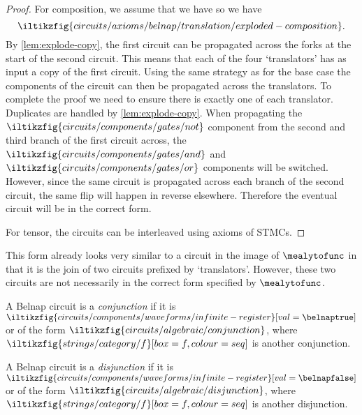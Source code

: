 \begin{proof}
    For composition, we assume that we have
    so we have \[
        \iltikzfig{circuits/axioms/belnap/translation/exploded-composition}.
    \]
    By \cref{lem:explode-copy}, the first circuit can be propagated across
    the forks at the start of the second circuit.
    This means that each of the four `translators' has as input a copy of the
    first circuit.
    Using the same strategy as for the base case the components of the circuit
    can then be propagated across the translators.
    To complete the proof we need to ensure there is exactly one of each
    translator.
    Duplicates are handled by \cref{lem:explode-copy}.
    When propagating the \(
    \iltikzfig{circuits/components/gates/not}
    \) component from the second and third branch of the first circuit across,
    the \(
    \iltikzfig{circuits/components/gates/and}
    \) and \(
    \iltikzfig{circuits/components/gates/or}
    \) components will be switched.
    However, since the same circuit is propagated across each branch of the
    second circuit, the same
    flip will happen in reverse elsewhere.
    Therefore the eventual circuit will be in the correct form.

    For tensor, the circuits can be interleaved using axioms of STMCs.
\end{proof}

This form already looks very similar to a circuit in the image of
\(\mealytofunc\) in that it is the join of two circuits prefixed by
`translators'.
However, these two circuits are not necessarily in the correct form specified by
\(\mealytofunc\).

\begin{definition}[Conjunction]
    A Belnap circuit is a \emph{conjunction} if it is \(
    \iltikzfig{circuits/components/waveforms/infinite-register}[val=\belnaptrue]
    \) or of the form \(
    \iltikzfig{circuits/algebraic/conjunction}
    \), where \(
    \iltikzfig{strings/category/f}[box=f, colour=seq]
    \) is another conjunction.
\end{definition}

\begin{definition}[Disjunction]
    A Belnap circuit is a \emph{disjunction} if it is \(
    \iltikzfig{circuits/components/waveforms/infinite-register}[val=\belnapfalse]
    \) or of the form \(
    \iltikzfig{circuits/algebraic/disjunction}
    \), where \(
    \iltikzfig{strings/category/f}[box=f, colour=seq]
    \) is another disjunction.
\end{definition}

